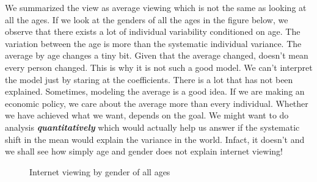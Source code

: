 We summarized the view as average viewing which is not the same as looking at all the ages. If we look at the genders of all the ages in the figure below, we observe that there exists a lot of individual variability 
conditioned on age. The variation between the age is more than the systematic individual variance. The average by age changes a tiny bit. Given that the average changed, doesn't mean every person changed.
This is why it is not such a good model. We can't interpret the model just by staring at the coefficients. There is a lot that has not been explained.  Sometimes, modeling the average is a good idea. If we are making an economic policy, we care about the average more than every individual. Whether we have achieved what we want, depends on the goal. We might want to do analysis \emph {\textbf{quantitatively}} which would actually help us answer if the systematic shift in the mean would explain the variance in the world. Infact, it doesn't and we shall see how simply age and gender does not explain internet viewing!
 
\begin{figure}[h]
\centering
\caption{Internet viewing by gender of all ages}
{\setlength{\fboxsep}{20pt}
\setlength{\fboxrule}{1pt}
\textcolor{Brown}{}
}
\end{figure} 


